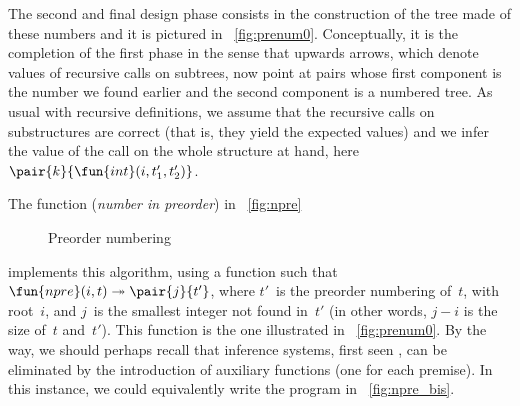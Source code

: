 The second and final design phase consists in the construction of the
tree made of these numbers and it is pictured in
\fig~\vref{fig:prenum0}. Conceptually, it is the completion of the
first phase in the sense that upwards arrows, which denote values of
recursive calls on subtrees, now point at pairs whose first component
is the number we found earlier and the second component is a numbered
tree. As usual with recursive definitions, we assume that the
recursive calls on substructures are correct (that is, they yield the
expected values) and we infer the value of the call on the whole
structure at hand, here \(\pair{k}{\fun{int}(i,t'_1,t'_2)}\).

The function  (\emph{number in
preorder}) in \fig~\vref{fig:npre}
\begin{figure}[b]
\abovedisplayskip=0pt
\belowdisplayskip=0pt
\centering
{}
\caption{Preorder numbering}
\label{fig:npre}
\end{figure}
implements this algorithm, using a function
 such that \(\fun{npre}(i,t)
\twoheadrightarrow \pair{j}{t'}\), where \(t'\)~is the preorder
numbering of~\(t\), with root~\(i\), and \(j\)~is the smallest integer
not found in~\(t'\) (in other words, \(j-i\) is the size of~\(t\)
and~\(t'\)). This function is the one illustrated in
\fig~\vref{fig:prenum0}. By the way, we should perhaps recall that
inference systems, first seen
, can be eliminated by the introduction of
auxiliary functions (one for each premise). In this instance, we could
equivalently write the program in
\fig~\vref{fig:npre_bis}.
